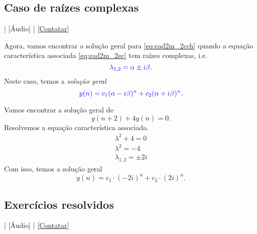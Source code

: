 \subsection{Caso de raízes complexas}

\begin{flushright}
  [Vídeo] | [Áudio] | \href{https://phkonzen.github.io/notas/contato.html}{[Contatar]}
\end{flushright}

Agora, vamos encontrar a solução geral para \eqref{eq:ead2m_2cch} quando a equação característica associada \eqref{eq:ead2m_2ec} tem raízes complexas, i.e.
\begin{equation}
  {\color{blue}\lambda_{1,2} = \alpha \pm i\beta}.
\end{equation}
Neste caso, temos a \emph{solução geral}
\begin{equation}
  {\color{blue}y(n) = c_1(\alpha-i\beta)^n + c_2(\alpha + i\beta)^n}.
\end{equation}

\begin{ex}
  Vamos encontrar a solução geral de
  \begin{equation}
    y(n+2) + 4y(n) = 0.
  \end{equation}
  Resolvemos a equação característica associada.
  \begin{gather}
    \lambda^2 + 4 = 0\\
    \lambda^2 = -4 \\
    \lambda_{1,2} = \pm 2i
  \end{gather}
  Com isso, temos a solução geral
  \begin{equation}
    y(n) = c_1\cdot (-2i)^n + c_2\cdot (2i)^n.
  \end{equation}
\end{ex}

\subsection*{Exercícios resolvidos}

\begin{flushright}
  [Vídeo] | [Áudio] | \href{https://phkonzen.github.io/notas/contato.html}{[Contatar]}
\end{flushright}

